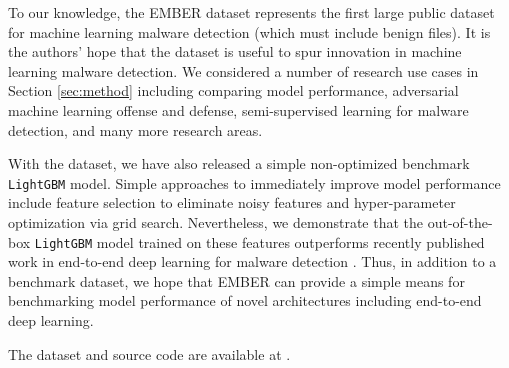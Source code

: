 To our knowledge, the EMBER dataset represents the first large public dataset for machine learning malware detection (which must include benign files).  It is the authors' hope that the dataset is useful to spur innovation in machine learning malware detection.  We considered a number of research use cases in Section \ref{sec:method} including comparing model performance, adversarial machine learning offense and defense, semi-supervised learning for malware detection, and many more research areas.

With the dataset, we have also released a simple non-optimized benchmark \texttt{LightGBM} model.  Simple approaches to immediately improve model performance include feature selection to eliminate noisy features and hyper-parameter optimization via grid search. Nevertheless, we demonstrate that the out-of-the-box \texttt{LightGBM} model trained on these features outperforms recently published work in end-to-end deep learning for malware detection \cite{raff2017malware}.  Thus, in addition to a benchmark dataset, we hope that EMBER can provide a simple means for benchmarking model performance of novel architectures including end-to-end deep learning.

The dataset and source code are available at \SOURCECODE.
